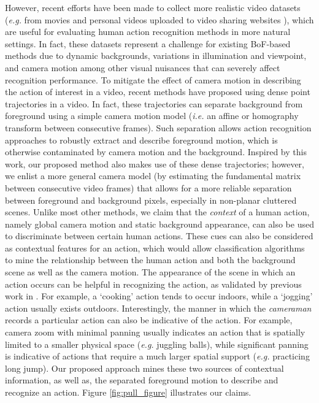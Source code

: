 \documentclass[runningheads]{llncs}
\begin{document}
However, recent efforts have been made to collect more realistic video datasets (\emph{e.g.} from movies and personal videos uploaded to video sharing websites  \cite{kuehne2011,  marszalek2009}), which are useful for evaluating human action recognition methods in more natural settings. In fact, these datasets represent a challenge for existing BoF-based methods due to dynamic backgrounds, variations in illumination and viewpoint, and camera motion among other visual nuisances that can severely affect recognition performance. To mitigate the effect of camera motion in describing the action of interest in a video, recent methods \cite{wang2013,wang2011} have proposed using dense point trajectories in a video. In fact, these trajectories can separate background from foreground using a simple camera motion model (\emph{i.e.} an affine or homography transform between consecutive frames). Such separation allows action recognition approaches to robustly extract and describe foreground motion, which is otherwise contaminated by camera motion and the background. Inspired by this work, our proposed method also makes use of these dense trajectories; however, we enlist a more general camera model (by estimating the fundamental matrix between consecutive video frames) that allows for a more reliable separation between foreground and background pixels, especially in non-planar cluttered scenes. Unlike most other methods, we claim that the \emph{context} of a human action, namely global camera motion and static background appearance, can also be used to discriminate between certain human actions. These cues can also be considered as contextual features for an action, which would allow classification algorithms to mine the relationship between the human action and both the background scene as well as the camera motion. The appearance of the scene in which an action occurs can be helpful in recognizing the action, as validated by previous work in \cite{marszalek2009}. For example, a `cooking' action tends to occur indoors, while a `jogging' action usually exists outdoors. Interestingly, the manner in which the \emph{cameraman} records a particular action can also be indicative of the action. For example, camera zoom with minimal panning usually indicates an action that is spatially limited to a smaller physical space (\emph{e.g.} juggling balls), while significant panning is indicative of actions that require a much larger spatial support (\emph{e.g.} practicing long jump). Our proposed approach mines these two sources of contextual information, as well as, the separated foreground motion to describe and recognize an action. Figure \ref{fig:pull_figure} illustrates our claims.
\end{document}
